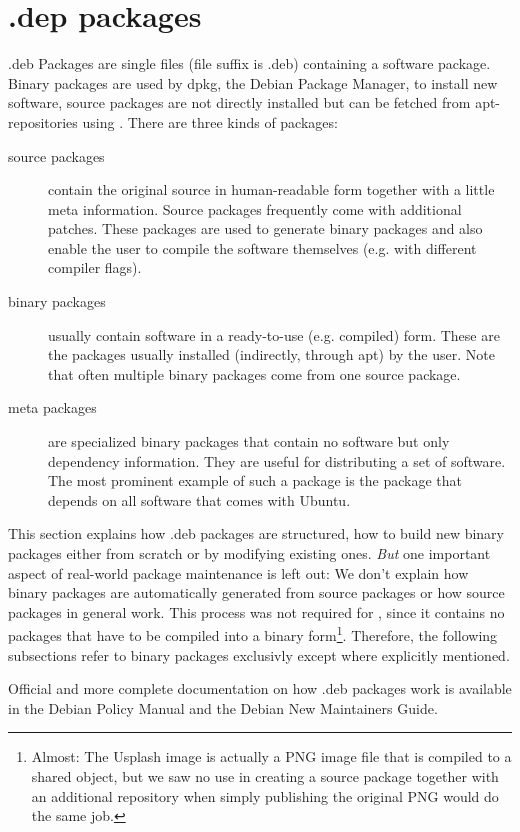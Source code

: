 \section{.dep packages}\label{chapter:deb packages}
.deb Packages are single files (file suffix is .deb) containing a software
package. Binary packages are used by dpkg, the Debian Package Manager, to
install new software, source packages are not directly installed but can be
fetched from apt-repositories using . 
There are three kinds of packages:
\begin{description}
  \item[source packages] contain the original source in human-readable form
    together with a little meta information. Source packages frequently come
    with additional patches. These packages are used to generate binary
    packages and also enable the user to compile the software themselves (e.g.
    with different compiler flags).
  \item[binary packages] usually contain software in a ready-to-use (e.g.
    compiled) form. These are the packages usually installed (indirectly,
    through apt) by the user. Note that often multiple binary packages come from
    one source package.
  \item[meta packages] are specialized binary packages that contain no software
    but only dependency information. They are useful for distributing a set of
    software. The most prominent example of such a package is the package
     that depends on all software that comes with Ubuntu.
\end{description}

This section explains how .deb packages are structured, how to build new
binary packages either from scratch or by modifying existing ones. \emph{But}
one important aspect of real-world package maintenance is left out: We don't
explain how binary packages are automatically generated from source packages or
how source packages in general work. This process was not required for \tunix,
since it contains no packages that have to be compiled into a binary
form\footnote{Almost: The \tunix Usplash image is actually a PNG image file that
is compiled to a shared object, but we saw no use in creating a source package
together with an additional repository when simply publishing the original PNG
would do the same job.}. Therefore, the following subsections refer to binary
packages exclusivly except where explicitly mentioned.

Official and more complete documentation on how .deb packages work is available 
in the Debian Policy Manual\cite{debian policy manual} and the Debian New
Maintainers Guide\cite{debian new maintainers guide}.

